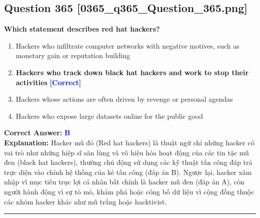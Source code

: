 \documentclass[11pt,a4paper]{article}
\begin{document}
\begin{minipage}{\textwidth}
\subsection*{Question 365 \quad \footnotesize{[0365\_q365\_Question\_365.png]}}
\noindent \textbf{Which statement describes red hat hackers?}

\begin{enumerate}[label=\Alph*.]
    \item Hackers who infiltrate computer networks with negative motives, such as monetary gain or reputation building
    \item \textbf{Hackers who track down black hat hackers and work to stop their activities} \hfill \textcolor{blue}{\textbf{[Correct]}}
    \item Hackers whose actions are often driven by revenge or personal agendas
    \item Hackers who expose large datasets online for the public good
\end{enumerate}

\noindent \textbf{Correct Answer:} \textcolor{blue}{\textbf{B}} \\[2pt]
\noindent \textbf{Explanation:} Hacker mũ đỏ (Red hat hackers) là thuật ngữ chỉ những hacker có vai trò như những hiệp sĩ săn lùng và vô hiệu hóa hoạt động của các tin tặc mũ đen (black hat hackers), thường chủ động sử dụng các kỹ thuật tấn công đáp trả trực diện vào chính hệ thống của kẻ tấn công (đáp án B). Ngược lại, hacker xâm nhập vì mục tiêu trục lợi cá nhân bất chính là hacker mũ đen (đáp án A), còn người hành động vì sự tò mò, khám phá hoặc công bố dữ liệu vì cộng đồng thuộc các nhóm hacker khác như mũ trắng hoặc hacktivist.

\par\vspace{0.3cm}
\hrule
\vspace{0.3cm}
\end{minipage}
\end{document}

